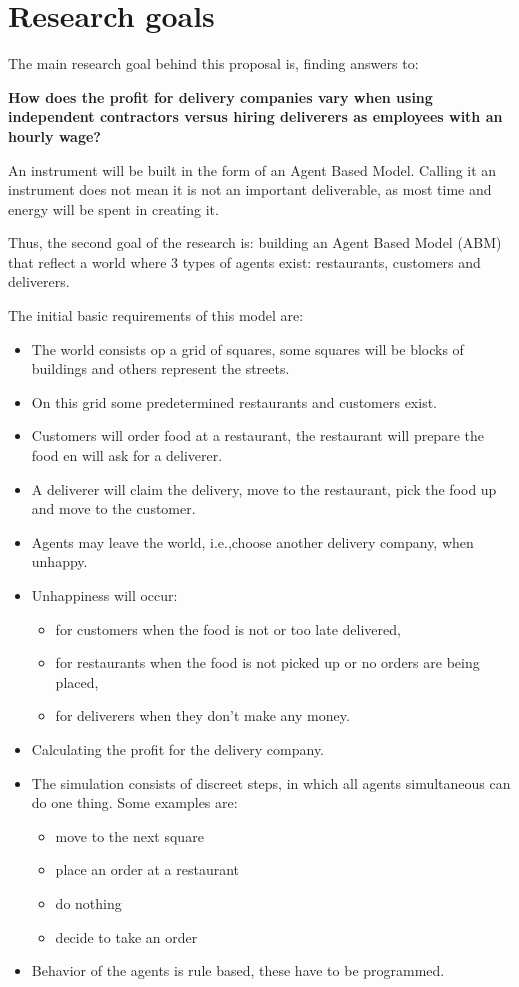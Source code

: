 
\section{Research goals}
The main research goal behind this proposal is, finding answers to:

\textbf{How does the profit for delivery companies vary when using independent contractors versus hiring deliverers as employees with an hourly wage? }

An instrument will be built in the form of an Agent Based Model.
Calling it an instrument does not mean it is not an important deliverable, as most time and energy will be spent in creating it.

Thus, the second goal of the research is: building an Agent Based Model (ABM) that reflect a world where 3 types of agents exist: restaurants, customers and deliverers.

The initial basic requirements of this model are:

\begin{itemize}
    \item   The world consists op a grid of squares, some squares will be blocks of buildings and others represent the streets.
    \item   On this grid some predetermined restaurants and customers exist.
    \item   Customers will order food at a restaurant, the restaurant will prepare the food en will ask for a deliverer.
    \item   A deliverer will claim the delivery, move to the restaurant, pick the food up and move to the customer.
    \item   Agents may leave the world, i.e.,choose another delivery company, when unhappy.
    \item   Unhappiness will occur:
    \begin{itemize}
        \item   for customers when the food is not or too late delivered,
        \item   for restaurants when the food is not picked up or no orders are being placed,
        \item   for deliverers when they don't make any money.
    \end{itemize}
    \item    Calculating the profit for the delivery company.
    \item    The simulation consists of discreet steps, in which all agents simultaneous can do one thing.
    Some examples are:
    \begin{itemize}
        \item  move to the next square
        \item  place an order at a restaurant
        \item  do nothing
        \item  decide to take an order
    \end{itemize}
    \item   Behavior of the agents is rule based, these have to be programmed.
\end{itemize}


